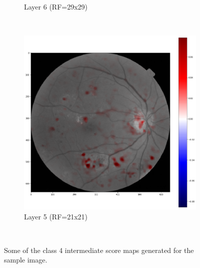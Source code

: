 \documentclass[review]{elsarticle}
\theoremstyle{definition} %
\theoremstyle{remark}
\begin{document}
\begin{figure}[!ht]
\begin{subfigure}{0.45\textwidth}
		\caption{Layer 6 (RF=29x29)}
		\label{fig:score_rf29}
	\end{subfigure}
	~ %
	\begin{subfigure}{0.45\textwidth}
		\includegraphics[width=\textwidth]{./figures/maps/rf21c.png}
		\caption{Layer 5 (RF=21x21)}
		\label{fig:score_rf21}
	\end{subfigure}\\
	\caption{Some of the class 4 intermediate score maps generated for the sample image.}
	\label{fig:scoremaps2}
\end{figure}


 
\end{document}
